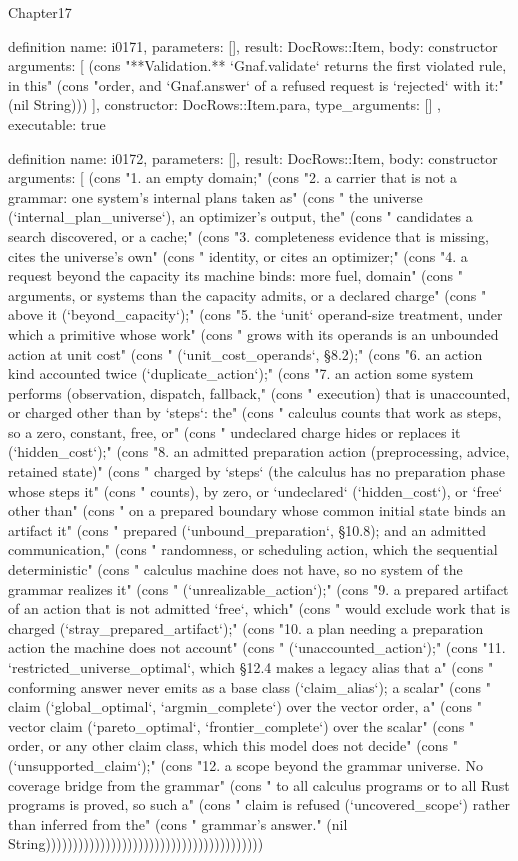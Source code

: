 \begin{lexlean}{Chapter17}
\begin{semanticmodule}
definition{
  name: i0171,
  parameters: [],
  result: DocRows::Item,
  body: constructor{
    arguments: [
      (cons "**Validation.** `Gnaf.validate` returns the first violated rule, in this" (cons "order, and `Gnaf.answer` of a refused request is `rejected` with it:" (nil String)))
    ],
    constructor: DocRows::Item.para,
    type_arguments: []
  },
  executable: true
}

definition{
  name: i0172,
  parameters: [],
  result: DocRows::Item,
  body: constructor{
    arguments: [
      (cons "1. an empty domain;" (cons "2. a carrier that is not a grammar: one system's internal plans taken as" (cons "   the universe (`internal_plan_universe`), an optimizer's output, the" (cons "   candidates a search discovered, or a cache;" (cons "3. completeness evidence that is missing, cites the universe's own" (cons "   identity, or cites an optimizer;" (cons "4. a request beyond the capacity its machine binds: more fuel, domain" (cons "   arguments, or systems than the capacity admits, or a declared charge" (cons "   above it (`beyond_capacity`);" (cons "5. the `unit` operand-size treatment, under which a primitive whose work" (cons "   grows with its operands is an unbounded action at unit cost" (cons "   (`unit_cost_operands`, §8.2);" (cons "6. an action kind accounted twice (`duplicate_action`);" (cons "7. an action some system performs (observation, dispatch, fallback," (cons "   execution) that is unaccounted, or charged other than by `steps`: the" (cons "   calculus counts that work as steps, so a zero, constant, free, or" (cons "   undeclared charge hides or replaces it (`hidden_cost`);" (cons "8. an admitted preparation action (preprocessing, advice, retained state)" (cons "   charged by `steps` (the calculus has no preparation phase whose steps it" (cons "   counts), by zero, or `undeclared` (`hidden_cost`), or `free` other than" (cons "   on a prepared boundary whose common initial state binds an artifact it" (cons "   prepared (`unbound_preparation`, §10.8); and an admitted communication," (cons "   randomness, or scheduling action, which the sequential deterministic" (cons "   calculus machine does not have, so no system of the grammar realizes it" (cons "   (`unrealizable_action`);" (cons "9. a prepared artifact of an action that is not admitted `free`, which" (cons "   would exclude work that is charged (`stray_prepared_artifact`);" (cons "10. a plan needing a preparation action the machine does not account" (cons "    (`unaccounted_action`);" (cons "11. `restricted_universe_optimal`, which §12.4 makes a legacy alias that a" (cons "    conforming answer never emits as a base class (`claim_alias`); a scalar" (cons "    claim (`global_optimal`, `argmin_complete`) over the vector order, a" (cons "    vector claim (`pareto_optimal`, `frontier_complete`) over the scalar" (cons "    order, or any other claim class, which this model does not decide" (cons "    (`unsupported_claim`);" (cons "12. a scope beyond the grammar universe. No coverage bridge from the grammar" (cons "    to all calculus programs or to all Rust programs is proved, so such a" (cons "    claim is refused (`uncovered_scope`) rather than inferred from the" (cons "    grammar's answer." (nil String))))))))))))))))))))))))))))))))))))))))
}}
\end{semanticmodule}
\end{lexlean}
